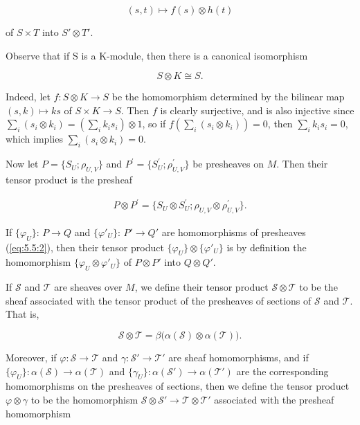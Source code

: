 \begin{equation}
\tag{1}\label{eq:5.9:1}
(s,t)\mapsto f(s)\otimes h(t)
\end{equation}

of  $ S \times T $ into  $ S' \otimes T' $.

Observe that if S is a K-module, then there is a canonical isomorphism

\begin{equation}
\tag{2}\label{eq:5.9:2}
S\otimes K\cong S.
\end{equation}

Indeed, let $f: S \otimes K \to S$ be the homomorphism determined by the bilinear map $(s, k) \mapsto ks$ of $S \times K \to S$. Then $f$ is clearly surjective, and is also injective since $\sum_{i}(s_{i} \otimes k_{i}) = \left(\sum_{i} k_{i} s_{i}\right) \otimes 1$, so if $f\left(\sum_{i}(s_{i} \otimes k_{i})\right) = 0$, then $\sum_{i} k_{i} s_{i} = 0$, which implies $\sum_{i}(s_{i} \otimes k_{i}) = 0$.

Now let $P=\{S_{U};\rho_{U,V}\}$ and $P^{\prime}=\{S_{U}^{\prime};\rho_{U,V}^{\prime}\}$ be presheaves on $M$. Then their tensor product is the presheaf

\begin{equation}
\tag{3}\label{eq:5.9:3}
\begin{array}{r}{P\otimes P^{\prime}=\{S_{U}\otimes S_{U}^{\prime};\rho_{U,V}\otimes\rho_{U,V}^{\prime}\}.}\end{array}
\end{equation}

If $\{\varphi_U\}$: $P \to Q$ and $\{\varphi'_U\}$: $P' \to Q'$ are homomorphisms of presheaves (\eqref{eq:5.5:2}), then their tensor product $\{\varphi_U\} \otimes \{\varphi'_U\}$ is by definition the homomorphism $\{\varphi_U \otimes \varphi'_U\}$ of $P \otimes P'$ into $Q \otimes Q'$.

If $\mathcal{S}$ and $\mathcal{T}$ are sheaves over $M$, we define their tensor product $\mathcal{S} \otimes \mathcal{T}$ to be the sheaf associated with the tensor product of the presheaves of sections of $\mathcal{S}$ and $\mathcal{T}$. That is,

\begin{equation}
\tag{4}\label{eq:5.9:4}
\mathcal{S}\otimes\mathcal{T}=\beta\big(\alpha(\mathcal{S})\otimes\alpha(\mathcal{T})\big).
\end{equation}

Moreover, if $\varphi: \mathcal{S} \to \mathcal{T}$ and $\gamma: \mathcal{S}' \to \mathcal{T}'$ are sheaf homomorphisms, and if $\{\varphi_U\}: \alpha(\mathcal{S}) \to \alpha(\mathcal{T})$ and $\{\gamma_U\}: \alpha(\mathcal{S}') \to \alpha(\mathcal{T}')$ are the corresponding homomorphisms on the presheaves of sections, then we define the tensor product $\varphi \otimes \gamma$ to be the homomorphism $\mathcal{S} \otimes \mathcal{S}' \to \mathcal{T} \otimes \mathcal{T}'$ associated with the presheaf homomorphism

